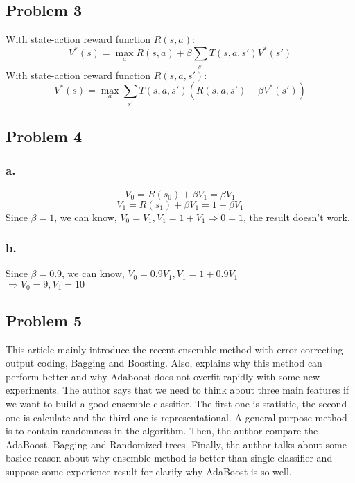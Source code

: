 \documentclass[12pt]{article}
\begin{document}
        \subsection{Problem 3}
            With state-action reward function $R(s,a)$:
                $$V^*(s)=\max_aR(s,a)+\beta\sum_{s'}T(s,a,s')V^*(s')$$
            With state-action reward function $R(s,a,s')$:
                $$V^*(s)=\max_a\sum_{s'}T(s,a,s')(R(s,a,s')+\beta V^*(s'))$$
        \subsection{Problem 4}
            \subsubsection{a.}
                $$V_0=R(s_0)+\beta V_1=\beta V_1$$
                $$V_1=R(s_1)+\beta V_1=1+\beta V_1$$
                Since $\beta=1$, we can know, $V_0=V_1,V_1=1+V_1\Rightarrow 0=1$, the result doesn't work.
            \subsubsection{b.}
                Since $\beta=0.9$, we can know, $V_0=0.9V_1,V_1=1+0.9V_1$\\
                $\Rightarrow V_0=9,V_1=10$
        \subsection{Problem 5}
            This article mainly introduce the recent ensemble method with error-correcting output coding, Bagging and Boosting. Also, explains
            why this method can perform better and why Adaboost does not overfit rapidly with some new experiments. The author says that we need
            to think about three main features if we want to build a good ensemble classifier. The first one is statistic, the second one is calculate
            and the third one is representational. A general purpose method is to contain randomness in the algorithm. Then, the author compare the
            AdaBoost, Bagging and Randomized trees. Finally, the author talks about some basice reason about why ensemble method is better than single
            classifier and suppose some experience result for clarify why AdaBoost is so well.
\end{document}
